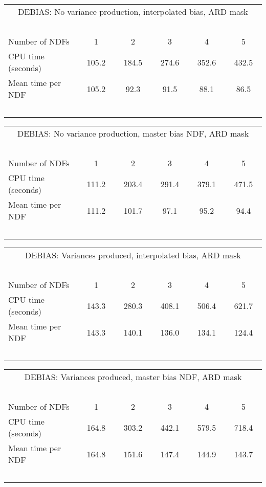 \begin{center}
   \begin{tabular}{|l||c|c|c|c|c|}
   \multicolumn{6}{c}{DEBIAS: No variance production, interpolated bias,
   ARD mask} \\
   \multicolumn{6}{l}{~~~}
   \\ \hline
   Number of NDFs    & ~~~1~~~ & ~~~2~~~ & ~~~3~~~ & ~~~4~~~ & ~~~5~~~
    \\ \hline
   CPU time (seconds)& 105.2   & 184.5   & 274.6   & 352.6   & 432.5
    \\ \hline
   Mean time per NDF & 105.2   & 92.3    & 91.5    & 88.1    & 86.5
    \\ \hline
   \multicolumn{6}{l}{~~~}
   \\ 
   \end{tabular}

   \begin{tabular}{|l||c|c|c|c|c|}
   \multicolumn{6}{c}{DEBIAS: No variance production, master bias NDF,
   ARD mask} \\
   \multicolumn{6}{l}{~~~}
   \\ \hline
   Number of NDFs    & ~~~1~~~ & ~~~2~~~ & ~~~3~~~ & ~~~4~~~ & ~~~5~~~
    \\ \hline
   CPU time (seconds)& 111.2   & 203.4   & 291.4   & 379.1   & 471.5
    \\ \hline
   Mean time per NDF & 111.2   & 101.7   & 97.1    & 95.2    & 94.4
    \\ \hline
   \multicolumn{6}{l}{~~~}
   \\ 
   \end{tabular}

   \begin{tabular}{|l||c|c|c|c|c|}
   \multicolumn{6}{c}{DEBIAS: Variances produced, interpolated bias,
   ARD mask} \\
   \multicolumn{6}{l}{~~~}
   \\ \hline
   Number of NDFs    & ~~~1~~~ & ~~~2~~~ & ~~~3~~~ & ~~~4~~~ & ~~~5~~~
    \\ \hline
   CPU time (seconds)& 143.3   & 280.3   & 408.1   & 506.4   & 621.7
    \\ \hline
   Mean time per NDF & 143.3   & 140.1   & 136.0   & 134.1   & 124.4
    \\ \hline
   \multicolumn{6}{l}{~~~}
   \\
   \end{tabular}

   \begin{tabular}{|l||c|c|c|c|c|}
   \multicolumn{6}{c}{DEBIAS: Variances produced, master bias NDF,
   ARD mask} \\
   \multicolumn{6}{l}{~~~}
   \\ \hline
   Number of NDFs    & ~~~1~~~ & ~~~2~~~ & ~~~3~~~ & ~~~4~~~ & ~~~5~~~
    \\ \hline
   CPU time (seconds)& 164.8   & 303.2   & 442.1   & 579.5   & 718.4
    \\ \hline
   Mean time per NDF & 164.8   & 151.6   & 147.4   & 144.9   & 143.7
    \\ \hline
   \multicolumn{6}{l}{~~~}
   \\
   \end{tabular}
\end{center}

